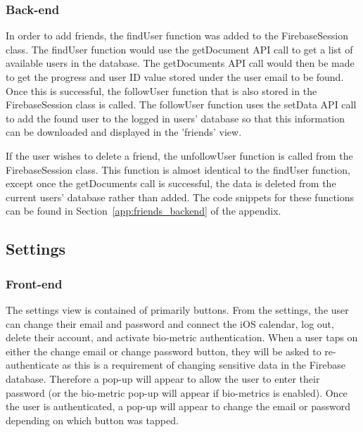         
        
        \subsubsection{Back-end}
        In order to add friends, the findUser function was added to the FirebaseSession class. The findUser function would use the getDocument API call to get a list of available users in the database.  The getDocuments API call would then be made to get the progress and user ID value stored under the user email to be found.  Once this is successful, the followUser function that is also stored in the FirebaseSession class is called.  The followUser function uses the setData API call to add the found user to the logged in users' database so that this information can be downloaded and displayed in the 'friends' view.
        
        If the user wishes to delete a friend, the unfollowUser function is called from the FirebaseSession class.  This function is almost identical to the findUser function, except once the getDocuments call is successful, the data is deleted from the current users' database rather than added.  The code snippets for these functions can be found in Section~\ref{app:friends_backend} of the appendix.
        
        \subsection{Settings}
        \subsubsection{Front-end}
        The settings view is contained of primarily buttons.  From the settings, the user can change their email and password and connect the iOS calendar, log out, delete their account, and activate bio-metric authentication.  When a user taps on either the change email or change password button, they will be asked to re-authenticate as this is a requirement of changing sensitive data in the Firebase database.  Therefore a pop-up will appear to allow the user to enter their password (or the bio-metric pop-up will appear if bio-metrics is enabled).  Once the user is authenticated, a pop-up will appear to change the email or password depending on which button was tapped.
        
        
        
